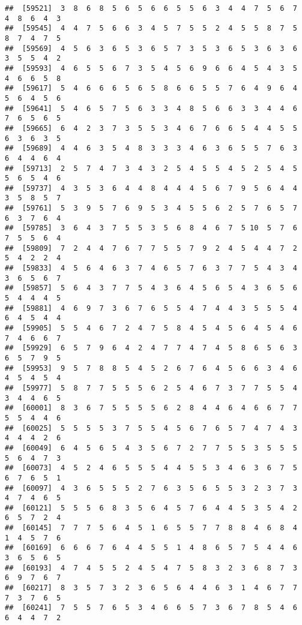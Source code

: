 \documentclass[
]{book}
\begin{document}
\begin{verbatim}
##  [59521]  3  8  6  8  5  6  5  6  6  5  5  6  3  4  4  7  5  6  7  4  8  6  4  3
##  [59545]  4  4  7  5  6  6  3  4  5  7  5  5  2  4  5  5  8  7  5  8  7  4  7  5
##  [59569]  4  5  6  3  6  5  3  6  5  7  3  5  3  6  5  3  6  3  6  3  5  5  4  2
##  [59593]  4  6  5  5  6  7  3  5  4  5  6  9  6  6  4  5  4  3  5  4  6  6  5  8
##  [59617]  5  4  6  6  6  5  6  5  8  6  6  5  5  7  6  4  9  6  4  5  6  4  5  6
##  [59641]  5  4  6  5  7  5  6  3  3  4  8  5  6  6  3  3  4  4  6  7  6  5  6  5
##  [59665]  6  4  2  3  7  3  5  5  3  4  6  7  6  6  5  4  4  5  5  6  3  6  3  5
##  [59689]  4  4  6  3  5  4  8  3  3  3  4  6  3  6  5  5  7  6  3  6  4  4  6  4
##  [59713]  2  5  7  4  7  3  4  3  2  5  4  5  5  4  5  2  5  4  5  5  6  5  4  6
##  [59737]  4  3  5  3  6  4  4  8  4  4  4  5  6  7  9  5  6  4  4  3  5  8  5  7
##  [59761]  5  3  9  5  7  6  9  5  3  4  5  5  6  2  5  7  6  5  7  6  3  7  6  4
##  [59785]  3  6  4  3  7  5  5  3  5  6  8  4  6  7  5 10  5  7  6  7  5  5  6  4
##  [59809]  7  2  4  4  7  6  7  7  5  5  7  9  2  4  5  4  4  7  2  5  4  2  2  4
##  [59833]  4  5  6  4  6  3  7  4  6  5  7  6  3  7  7  5  4  3  4  3  6  5  6  7
##  [59857]  5  6  4  3  7  7  5  4  3  6  4  5  6  5  4  3  6  5  6  5  4  4  4  5
##  [59881]  4  6  9  7  3  6  7  6  5  5  4  7  4  4  3  5  5  5  4  6  4  5  4  4
##  [59905]  5  5  4  6  7  2  4  7  5  8  4  5  4  5  6  4  5  4  6  7  4  6  6  7
##  [59929]  6  5  7  9  6  4  2  4  7  7  4  7  4  5  8  6  5  6  3  6  5  7  9  5
##  [59953]  9  5  7  8  8  5  4  5  2  6  7  6  4  5  6  6  3  4  6  4  5  4  5  4
##  [59977]  5  8  7  7  5  5  5  6  2  5  4  6  7  3  7  7  5  5  4  3  4  4  6  5
##  [60001]  8  3  6  7  5  5  5  5  6  2  8  4  4  6  4  6  6  7  7  5  5  4  4  6
##  [60025]  5  5  5  5  3  7  5  5  4  5  6  7  6  5  7  4  7  4  3  4  4  4  2  6
##  [60049]  6  4  5  6  5  4  3  5  6  7  2  7  7  5  5  3  5  5  5  5  6  4  7  3
##  [60073]  4  5  2  4  6  5  5  5  4  4  5  5  3  4  6  3  6  7  5  6  7  6  5  1
##  [60097]  4  3  6  5  5  5  2  7  6  3  5  6  5  5  3  2  3  7  3  4  7  4  6  5
##  [60121]  5  5  5  6  8  3  5  6  4  5  7  6  4  4  5  3  5  4  2  6  5  7  2  4
##  [60145]  7  7  7  5  6  4  5  1  6  5  5  7  7  8  8  4  6  8  4  1  4  5  7  6
##  [60169]  6  6  6  7  6  4  4  5  5  1  4  8  6  5  7  5  4  4  6  3  6  5  6  5
##  [60193]  4  7  4  5  5  2  4  5  4  7  5  8  3  2  3  6  8  7  3  6  9  7  6  7
##  [60217]  8  3  5  7  3  2  3  6  5  6  4  4  6  3  1  4  6  7  7  7  3  7  6  5
##  [60241]  7  5  5  7  6  5  3  4  6  6  5  7  3  6  7  8  5  4  6  6  4  4  7  2

\end{verbatim}
\end{document}
